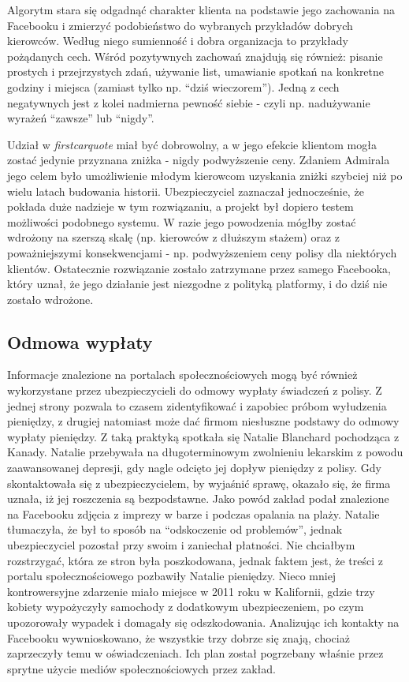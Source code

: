 \documentclass[polish]{kbk}
\begin{document}
Algorytm stara się odgadnąć charakter klienta na podstawie jego zachowania na Facebooku i zmierzyć podobieństwo do wybranych przykładów dobrych kierowców. Według niego sumienność i dobra organizacja to przykłady pożądanych cech. Wśród pozytywnych zachowań znajdują się również: pisanie prostych i przejrzystych zdań, używanie list, umawianie spotkań na konkretne godziny i miejsca (zamiast tylko np. ``dziś wieczorem''). Jedną z cech negatywnych jest z kolei nadmierna pewność siebie - czyli np. nadużywanie wyrażeń ``zawsze'' lub ``nigdy''.

Udział w \textit{firstcarquote} miał być dobrowolny, a w jego efekcie klientom mogła zostać jedynie przyznana zniżka - nigdy podwyższenie ceny. Zdaniem Admirala jego celem było umożliwienie młodym kierowcom uzyskania zniżki szybciej niż po wielu latach budowania historii. Ubezpieczyciel zaznaczał jednocześnie, że pokłada duże nadzieje w tym rozwiązaniu, a projekt był dopiero testem możliwości podobnego systemu. W razie jego powodzenia mógłby zostać wdrożony na szerszą skalę (np. kierowców z dłuższym stażem) oraz z poważniejszymi konsekwencjami - np. podwyższeniem ceny polisy dla niektórych klientów. Ostatecznie rozwiązanie zostało zatrzymane przez samego Facebooka, który uznał, że jego działanie jest niezgodne z polityką platformy, i do dziś nie zostało wdrożone.

\subsection{Odmowa wypłaty \cite{insurance-quotes}}
Informacje znalezione na portalach społecznościowych mogą być również wykorzystane przez ubezpieczycieli do odmowy wypłaty świadczeń z polisy. Z jednej strony pozwala to czasem zidentyfikować i zapobiec próbom wyłudzenia pieniędzy, z drugiej natomiast może dać firmom niesłuszne podstawy do odmowy wypłaty pieniędzy. Z taką praktyką spotkała się Natalie Blanchard pochodząca z Kanady. Natalie przebywała na długoterminowym zwolnieniu lekarskim z powodu zaawansowanej depresji, gdy nagle odcięto jej dopływ pieniędzy z polisy. Gdy skontaktowała się z ubezpieczycielem, by wyjaśnić sprawę, okazało się, że firma uznała, iż jej roszczenia są bezpodstawne. Jako powód zakład podał znalezione na Facebooku zdjęcia z imprezy w barze i podczas opalania na plaży. Natalie tłumaczyła, że był to sposób na ``odskoczenie od problemów'', jednak ubezpieczyciel pozostał przy swoim i zaniechał płatności. Nie chciałbym rozstrzygać, która ze stron była poszkodowana, jednak faktem jest, że treści z portalu społecznościowego pozbawiły Natalie pieniędzy. Nieco mniej kontrowersyjne zdarzenie miało miejsce w 2011 roku w Kalifornii, gdzie trzy kobiety wypożyczyły samochody z dodatkowym ubezpieczeniem, po czym upozorowały wypadek i domagały się odszkodowania. Analizując ich kontakty na Facebooku wywnioskowano, że wszystkie trzy dobrze się znają, chociaż zaprzeczyły temu w oświadczeniach. Ich plan został pogrzebany właśnie przez sprytne użycie mediów społecznościowych przez zakład.
\end{document}

